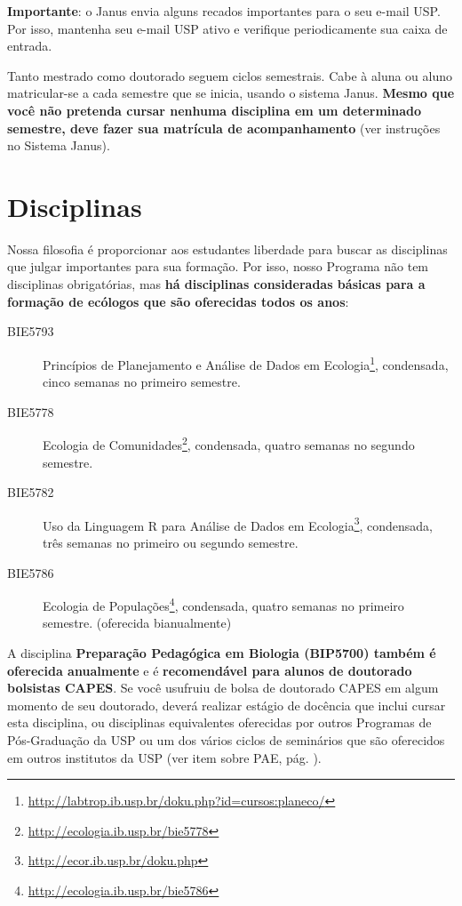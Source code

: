 \textbf{Importante}: o Janus envia alguns recados importantes para o
seu e-mail USP. Por isso, mantenha seu e-mail USP ativo e verifique
periodicamente sua caixa de entrada.

Tanto mestrado como doutorado seguem ciclos semestrais. Cabe à aluna
ou aluno matricular-se a cada semestre que se inicia, usando o sistema
Janus. \textbf{Mesmo que você não pretenda cursar nenhuma disciplina em um
determinado semestre, deve fazer sua matrícula de acompanhamento} (ver
instruções no Sistema Janus).

\section{Disciplinas}
\label{sec:disciplinas}

Nossa filosofia é proporcionar aos estudantes liberdade para buscar as disciplinas
que julgar importantes para sua formação. Por isso, nosso Programa não
tem disciplinas obrigatórias, mas \textbf{há  disciplinas
  consideradas básicas para a formação de ecólogos que são oferecidas
  todos os anos}:


\begin{description}
  \item[BIE5793] Princípios de Planejamento e Análise de Dados em Ecologia\footnote{\url{http://labtrop.ib.usp.br/doku.php?id=cursos:planeco/}}, condensada, cinco semanas no primeiro semestre.
  \item[BIE5778] Ecologia de Comunidades\footnote{\url{http://ecologia.ib.usp.br/bie5778}}, condensada, quatro semanas no segundo semestre.
  \item[BIE5782] Uso da Linguagem R para Análise de Dados em Ecologia\footnote{\url{http://ecor.ib.usp.br/doku.php}}, condensada, três semanas no primeiro ou segundo semestre.
  \item[BIE5786] Ecologia de Populações\footnote{\url{http://ecologia.ib.usp.br/bie5786}}, condensada, quatro semanas no primeiro semestre. (oferecida bianualmente)
\end{description}

A disciplina \textbf{Preparação Pedagógica em Biologia (BIP5700)
  também é oferecida anualmente} e é \textbf{recomendável para alunos
  de doutorado bolsistas CAPES}. Se você usufruiu de bolsa de
doutorado CAPES em algum momento de seu doutorado, deverá realizar
estágio de docência que inclui cursar esta disciplina, ou disciplinas
equivalentes oferecidas por outros Programas de Pós-Graduação da USP
ou um dos vários ciclos de seminários que são oferecidos em outros
institutos da USP (ver item sobre PAE, pág. \pageref{subsec:pae}).

